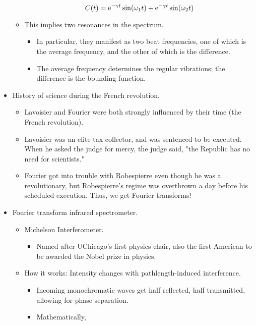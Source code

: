 \documentclass[../notes.tex]{subfiles}
\begin{document}
\begin{itemize}
\begin{itemize}
        \begin{equation*}
            C(t) = \e[-\gamma t]\sin(\omega_1t)+\e[-\gamma t]\sin(\omega_2t)
        \end{equation*}
        \item This implies two resonances in the spectrum.
        \begin{itemize}
            \item In particular, they manifest as two beat frequencies, one of which is the average frequency, and the other of which is the difference.
            \item The average frequency determines the regular vibrations; the difference is the bounding function.
        \end{itemize}
    \end{itemize}
    \item History of science during the French revolution.
    \begin{itemize}
        \item Lavoisier and Fourier were both strongly influenced by their time (the French revolution).
        \item Lavoisier was an elite tax collector, and was sentenced to be executed. When he asked the judge for mercy, the judge said, "the Republic has no need for scientists."
        \item Fourier got into trouble with Robespierre even though he was a revolutionary, but Robespierre's regime was overthrown a day before his scheduled execution. Thus, we get Fourier transforms!
    \end{itemize}
    \item Fourier transform infrared spectrometer.
    \begin{itemize}
        \item Michelson Interferometer.
        \begin{itemize}
            \item Named after UChicago's first physics chair, also the first American to be awarded the Nobel prize in physics.
        \end{itemize}
        \item How it works: Intensity changes with pathlength-induced interference.
        \begin{itemize}
            \item Incoming monochromatic waves get half reflected, half transmitted, allowing for phase separation.
            \item Mathematically,

\end{itemize}
\end{itemize}
\end{itemize}
\end{document}
